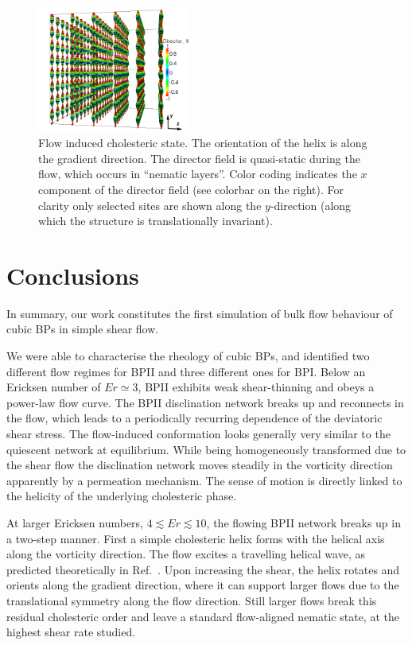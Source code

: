\documentclass[aps,pre,reprint,superscriptaddress, twocolumn]{revtex4}
\begin{document}
\begin{figure}[htpb]
\includegraphics[width=0.45\textwidth]{dir3d+y-200k_run1179.png}
\caption{Flow induced cholesteric state. The orientation of the helix is 
along the gradient direction. The director field is quasi-static during 
the flow, which occurs in ``nematic layers''. Color coding indicates the 
$x$ component of the director field (see colorbar on the right).
For clarity only selected sites are shown along the $y$-direction (along which
the structure is translationally invariant).}
\label{fig:cholflow}
\end{figure}




\section{Conclusions}

In summary, our work constitutes the first simulation of bulk flow behaviour 
of cubic BPs in simple shear flow. 
  
We were able to characterise the rheology of cubic BPs, and identified 
two different flow regimes for BPII and three different ones for BPI. 
Below an Ericksen number of $Er\simeq3$, BPII exhibits weak shear-thinning and 
obeys a power-law flow curve.  
The BPII disclination network breaks up and reconnects 
in the flow, which leads to a periodically recurring dependence 
of the deviatoric shear stress. The flow-induced conformation looks generally
very similar to the quiescent network at equilibrium. 
While being homogeneously transformed due to the shear flow
the disclination network moves steadily in the vorticity direction
apparently by a permeation mechanism. The sense of
motion is directly linked to the helicity of the underlying cholesteric phase.

At larger Ericksen numbers, $4\lesssim Er\lesssim 10$, the flowing BPII network 
breaks up in a two-step manner. First a simple cholesteric helix forms with the helical axis 
along the vorticity direction. The flow excites a travelling helical wave,
as predicted theoretically in Ref.~\cite{Rey:1996a,Rey:1996b}.
Upon increasing the shear, the helix rotates and orients along the
gradient direction, where it can support larger flows due to the translational
symmetry along the flow direction. Still larger flows break this residual
cholesteric order and leave a standard flow-aligned nematic state,
at the highest shear rate studied.
\end{document}
